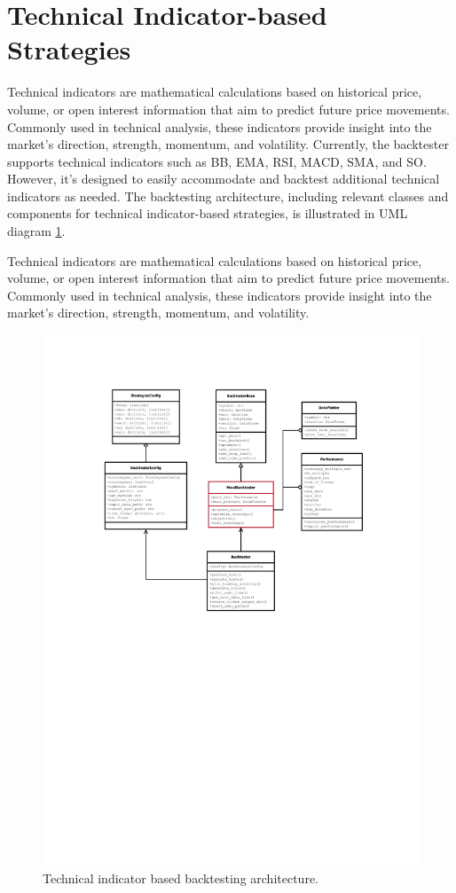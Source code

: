 \section{Technical Indicator-based Strategies}

Technical indicators are mathematical calculations based on historical price, volume, or open interest information that aim to predict future price movements.
Commonly used in technical analysis, these indicators provide insight into the market's direction, strength, momentum, and volatility.
Currently, the backtester supports technical indicators such as BB, EMA, RSI, MACD, SMA, and SO. However, it's designed to easily
accommodate and backtest additional technical indicators as needed.
The backtesting architecture, including relevant classes and components for technical indicator-based strategies, is illustrated in UML diagram \ref{fig:tech_indicator_arch}.

Technical indicators are mathematical calculations based on historical price, volume, or open interest information that aim to predict future price movements.
Commonly used in technical analysis, these indicators provide insight into the market's direction, strength, momentum, and volatility.
\noindent

\begin{figure}[ht!]
\centering
\includegraphics[page=1, trim=30mm 135mm 0 25mm, width=1.1\textwidth, clip]{./pdf/backtester_uml.pdf}
\caption{Technical indicator based backtesting architecture.}
\label{fig:tech_indicator_arch}
\end{figure}

